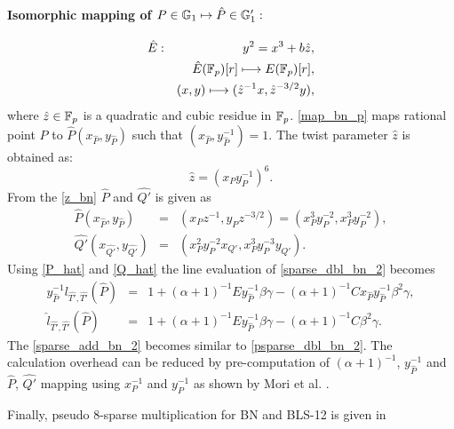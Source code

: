 \paragraph*{Isomorphic mapping of $P \in  {\mathbb{G}}_{1} \mapsto \hat{P} \in {\mathbb{G}}_{1}':$}
\begin{eqnarray}
\hat{E}&:&y^2=x^3+b\hat{z},\nonumber\\
&&\hat{E}(\mathbb{F}_p)[r]\longmapsto E(\mathbb{F}_p)[r],\nonumber\\
&&(x,y)\longmapsto (\hat{z}^{-1}x,\hat{z}^{-3/2}y),\label{map_bn_p}
\end{eqnarray}
where $\hat{z} \in {\mathbb{F}}_{p}$ is a quadratic and cubic residue in ${\mathbb{F}}_{p}$.
\eqref{map_bn_p} maps rational point $P$ to $\hat{P}(x_{\hat{P}},y_{\hat{P}})$ such that $(x_{\hat{P}},y_{\hat{P}}^{-1})=1$.
The twist parameter $\hat{z}$ is obtained as:
\begin{equation}\label{z_bn}
\hat{z}=(x_Py_P^{-1})^6.
\end{equation}
From the \eqref{z_bn} $\hat{P}$ and $\hat{Q'}$ is given as
\begin{subequations}
	\begin{eqnarray}
	\hat{P}(x_{\hat{P}}, y_{\hat{P}})&=& (x_P z^{-1},y_P z^{-3/2}) =(x_P^3y_P^{-2},x_P^3y_P^{-2}), \label{P_hat} \\ 
	\hat{Q'}(x_{\hat{Q'}}, y_{\hat{Q'}})&=&(x_P^2y_P^{-2}x_{Q'},x_P^3y_P^{-3}y_{Q'}). \label{Q_hat}
	\end{eqnarray}
\end{subequations}
Using \eqref{P_hat} and \eqref{Q_hat} the line evaluation of \eqref{sparse_dbl_bn_2} becomes 
\begin{subequations}
	\begin{eqnarray}
	y_{\hat{P}}^{-1}l_{\hat{T'},\hat{T'}}(\hat{P})&=& 1+(\alpha+1)^{-1}Ey_{\hat{P}}^{-1}\beta\gamma-(\alpha+1)^{-1}Cx_{\hat{P}}y_{\hat{P}}^{-1}\beta^2 \gamma, \nonumber \\
	\hat{l}_{\hat{T'},\hat{T'}}(\hat{P})&=& 1+(\alpha+1)^{-1}Ey_{\hat{P}}^{-1}\beta\gamma-(\alpha+1)^{-1}C\beta^2 \gamma. 
	\label{psparse_dbl_bn_2} 
	\end{eqnarray}
\end{subequations}
The \eqref{sparse_add_bn_2} becomes similar to \eqref{psparse_dbl_bn_2}. The calculation overhead can be reduced by pre-computation of $(\alpha+1)^{-1}$, $y_{\hat{P}}^{-1}$ and $\hat{P}$, $\hat{Q'}$ mapping using $x_{P}^{-1}$ and $y_{P}^{-1}$ as shown by Mori et al. \cite{PAIRING:MANS13}. 

Finally, pseudo 8-sparse multiplication for BN and BLS-12 is given in 


